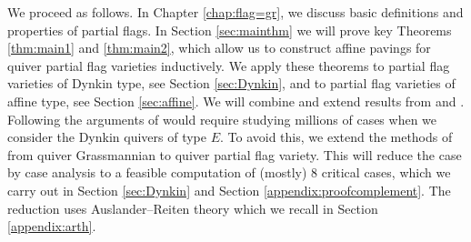 We proceed as follows. In Chapter \ref{chap:flag=gr}, we discuss basic definitions and properties of partial flags. In Section \ref{sec:mainthm} we will prove key Theorems \ref{thm:main1} and \ref{thm:main2}, which allow us to construct affine pavings for quiver partial flag varieties inductively. We apply these theorems to partial flag varieties of Dynkin type, see Section \ref{sec:Dynkin}, and to partial flag varieties of affine type, see Section \ref{sec:affine}. We will combine and extend results from \cite{irelli2019cell} and \cite{maksimau2019flag}.
Following the arguments of \cite{maksimau2019flag} would require studying millions of cases when we  consider the Dynkin quivers of type $E$. To avoid this, we extend the methods of \cite{irelli2019cell} from quiver Grassmannian to quiver partial flag variety. This will reduce the case by case analysis to a feasible computation of (mostly) 8 critical cases, which we carry out in Section \ref{sec:Dynkin} and Section \ref{appendix:proofcomplement}. The reduction uses Auslander--Reiten theory which we recall in Section \ref{appendix:arth}.
%
%



